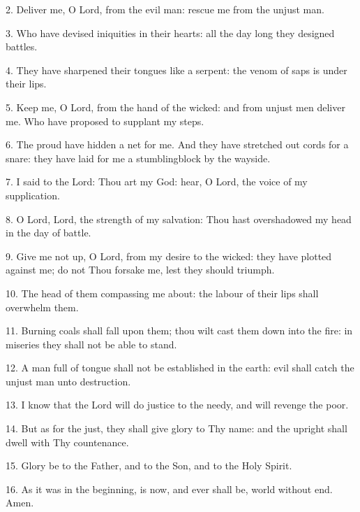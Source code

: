 2. Deliver me, O Lord, from the evil man: rescue me from the unjust man.

3. Who have devised iniquities in their hearts: all the day long they designed battles.

4. They have sharpened their tongues like a serpent: the venom of saps is under their lips.

5. Keep me, O Lord, from the hand of the wicked: and from unjust men deliver me. Who have proposed to supplant my steps.

6. The proud have hidden a net for me. And they have stretched out cords for a snare: they have laid for me a stumblingblock by the wayside.

7. I said to the Lord: Thou art my God: hear, O Lord, the voice of my supplication.

8. O Lord, Lord, the strength of my salvation: Thou hast overshadowed my head in the day of battle.

9. Give me not up, O Lord, from my desire to the wicked: they have plotted against me; do not Thou forsake me, lest they should triumph.

10. The head of them compassing me about: the labour of their lips shall overwhelm them.

11. Burning coals shall fall upon them; thou wilt cast them down into the fire: in miseries they shall not be able to stand.

12. A man full of tongue shall not be established in the earth: evil shall catch the unjust man unto destruction.

13. I know that the Lord will do justice to the needy, and will revenge the poor.

14. But as for the just, they shall give glory to Thy name: and the upright shall dwell with Thy countenance.

15. Glory be to the Father, and to the Son, and to the Holy Spirit.
 	
16. As it was in the beginning, is now, and ever shall be, world without end. Amen.